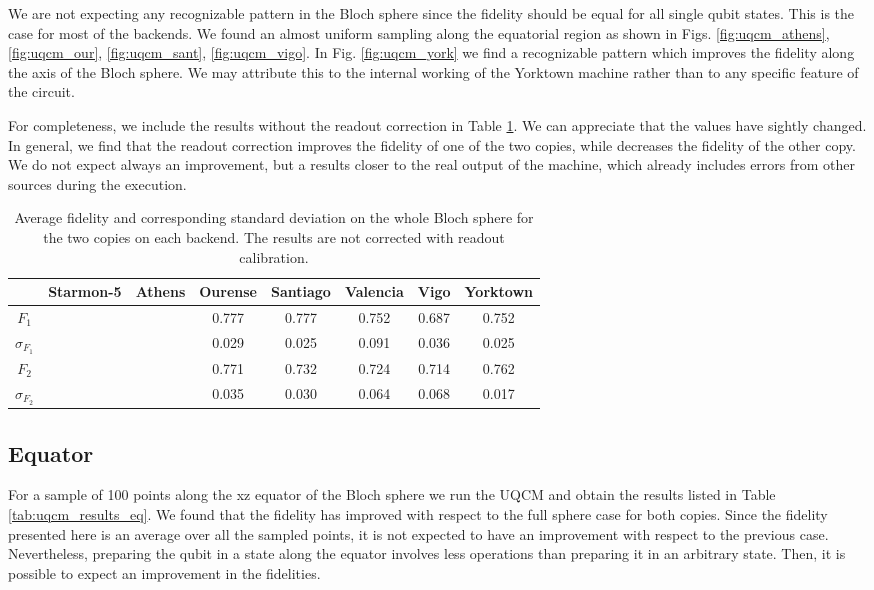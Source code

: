 We are not expecting any recognizable pattern in the Bloch sphere since the fidelity should be equal for all single qubit states. This is the case for most of the backends. We found an almost uniform sampling along the equatorial region as shown in Figs. \ref{fig:uqcm_athens}, \ref{fig:uqcm_our}, \ref{fig:uqcm_sant}, \ref{fig:uqcm_vigo}. In Fig. \ref{fig:uqcm_york} we find a recognizable pattern which improves the fidelity along the axis of the Bloch sphere. We may attribute this to the internal working of the Yorktown machine rather than to any specific feature of the circuit.

For completeness, we include the results without the readout correction in Table \ref{tab:uqcm_results_full_sphere_non}. We can appreciate that the values have sightly changed. In general, we find that the readout correction improves the fidelity of one of the two copies, while decreases the fidelity of the other copy. We do not expect always an improvement, but a results closer to the real output of the machine, which already includes errors from other sources during the execution.
 
\begin{table}[H]
    \centering
    \begin{tabular}{|c|c|c|c|c|c|c|c|}
    \hline
    \textbf{} & \textbf{Starmon-5} & \textbf{Athens} & \textbf{Ourense} & \textbf{Santiago} & \textbf{Valencia} & \textbf{Vigo} & \textbf{Yorktown} \\ \hline
    $F_1$              &  &  & 0.777 & 0.777 & 0.752 & 0.687 & 0.752\\ \hline
    $\sigma_{F_1}$     &  &  & 0.029 & 0.025 & 0.091 & 0.036 & 0.025 \\ \hline
    $F_2$              &  &  & 0.771 & 0.732 & 0.724 & 0.714 & 0.762 \\ \hline
    $\sigma_{F_2}$     &  &  & 0.035 & 0.030 & 0.064 & 0.068 & 0.017 \\ \hline
    \end{tabular}
    \caption{Average fidelity and corresponding standard deviation on the whole Bloch sphere for the two copies on each backend. The
results are not corrected with readout calibration.}\label{tab:uqcm_results_full_sphere_non}
\end{table}

\subsection{Equator}

For a sample of 100 points along the xz equator of the Bloch sphere we run the UQCM and obtain the results listed in Table \ref{tab:uqcm_results_eq}. We found that the fidelity has improved with respect to the full sphere case for both copies. Since the fidelity presented here is an average over all the sampled points, it is not expected to have an improvement with respect to the previous case. Nevertheless, preparing the qubit in a state along the equator involves less operations than preparing it in an arbitrary state. Then, it is possible to expect an improvement in the fidelities.

